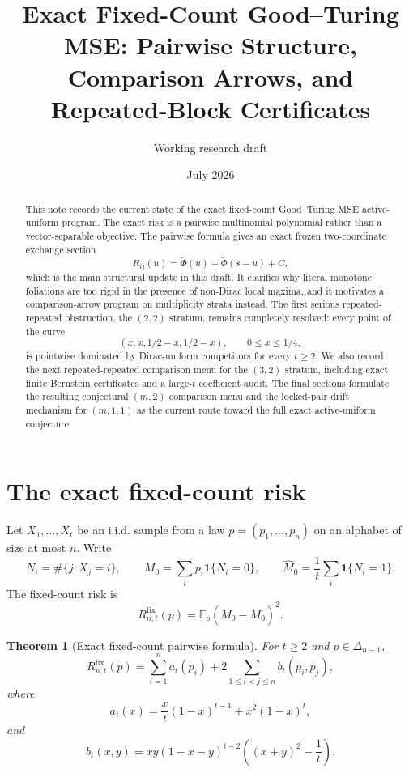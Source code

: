 \documentclass[11pt]{article}
\title{Exact Fixed-Count Good--Turing MSE: Pairwise Structure, Comparison Arrows, and Repeated-Block Certificates}
\author{Working research draft}
\date{July 2026}
\newtheorem{theorem}{Theorem}[section]
\theoremstyle{definition}
\newcommand{\E}{\mathbb E}
\newcommand{\ones}{\mathbf 1}
\newcommand{\fix}{\mathrm{fix}}
\begin{document}
\maketitle

\begin{abstract}
This note records the current state of the exact fixed-count Good--Turing MSE active-uniform program.  The exact risk is a pairwise multinomial polynomial rather than a vector-separable objective.  The pairwise formula gives an exact frozen two-coordinate exchange section
\[
  R_{ij}(u)=\widetilde\Phi(u)+\widetilde\Phi(s-u)+C,
\]
which is the main structural update in this draft.  It clarifies why literal monotone foliations are too rigid in the presence of non-Dirac local maxima, and it motivates a comparison-arrow program on multiplicity strata instead.  The first serious repeated-repeated obstruction, the $(2,2)$ stratum, remains completely resolved: every point of the curve
\[
  (x,x,1/2-x,1/2-x), \qquad 0\le x\le 1/4,
\]
is pointwise dominated by Dirac-uniform competitors for every $t\ge2$.  We also record the next repeated-repeated comparison menu for the $(3,2)$ stratum, including exact finite Bernstein certificates and a large-$t$ coefficient audit.  The final sections formulate the resulting conjectural $(m,2)$ comparison menu and the locked-pair drift mechanism for $(m,1,1)$ as the current route toward the full exact active-uniform conjecture.
\end{abstract}

\tableofcontents

\section{The exact fixed-count risk}

Let $X_1,\ldots,X_t$ be an i.i.d. sample from a law
$p=(p_1,\ldots,p_n)$ on an alphabet of size at most $n$.  Write
\[
  N_i=\#\{j:X_j=i\},
  \qquad
  M_0=\sum_i p_i\ones\{N_i=0\},
  \qquad
  \widehat M_0=\frac1t\sum_i\ones\{N_i=1\}.
\]
The fixed-count risk is
\[
  R_{n,t}^{\fix}(p)=\E_p(\widehat M_0-M_0)^2.
\]

\begin{theorem}[Exact fixed-count pairwise formula]\label{thm:fixed-pairwise}
For $t\ge2$ and $p\in\Delta_{n-1}$,
\[
  R_{n,t}^{\fix}(p)=\sum_{i=1}^n a_t(p_i)
  +2\sum_{1\le i<j\le n}b_t(p_i,p_j),
\]
where
\[
  a_t(x)=\frac{x}{t}(1-x)^{t-1}+x^2(1-x)^t,
\]
and
\[
  b_t(x,y)=xy(1-x-y)^{t-2}\left((x+y)^2-\frac1t\right).
\]
\end{theorem}
\end{document}
